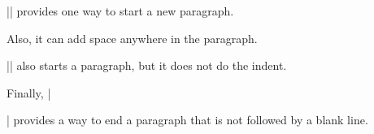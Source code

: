 \parindent=2pc
\indent |\indent| provides one way to start a new paragraph.\par
\indent Also, it can \indent add space anywhere in the paragraph.\par
\noindent |\noindent| also starts a paragraph, but it does not do the indent.\par
Finally, |\par| provides a way to end a paragraph that is not followed by a blank line.
\bye
